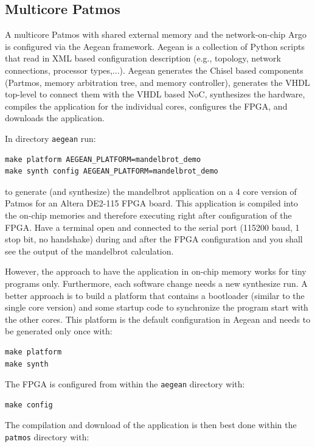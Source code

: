 \documentclass[a4paper,fontsize=10pt,twoside,DIV15,BCOR12mm,headinclude=true,footinclude=false,pagesize,bibtotoc]{scrbook}
\newcommand{\code}[1]{{\texttt{#1}}}
\begin{document}
\subsection{Multicore Patmos}

A multicore Patmos with shared external memory and the network-on-chip Argo is configured via
the Aegean framework. Aegean is a collection of Python scripts that read in XML based configuration
description (e.g., topology, network connections, processor types,...). Aegean generates the Chisel based
components (Partmos, memory arbitration tree, and memory controller), generates the VHDL top-level
to connect them with the VHDL based NoC, synthesizes the hardware, compiles the application for the
individual cores, configures the FPGA, and downloads the application.

In directory \code{aegean} run:

\begin{verbatim}
make platform AEGEAN_PLATFORM=mandelbrot_demo
make synth config AEGEAN_PLATFORM=mandelbrot_demo
\end{verbatim}

to generate (and synthesize) the mandelbrot application on a 4 core
version of Patmos for an Altera DE2-115 FPGA board. This application is compiled
into the on-chip memories and therefore executing right after configuration of the
FPGA. Have a terminal open and connected to the serial port (115200 baud, 1 stop bit,
no handshake) during and after the FPGA configuration and you shall see the output of
the mandelbrot calculation.

However, the approach to have the application in on-chip memory works for tiny programs
only. Furthermore, each software change needs a new synthesize run. A better approach is
to build a platform that contains a bootloader (similar to the single core version) and some
startup code to synchronize the program start with the other cores. This platform is the default
configuration in Aegean and needs to be generated only once with:

\begin{verbatim}
make platform
make synth
\end{verbatim}

The FPGA is configured from within the \code{aegean} directory with:

\begin{verbatim}
make config
\end{verbatim}

The compilation and download of the application is then best done within
the \code{patmos} directory with:
\end{document}
